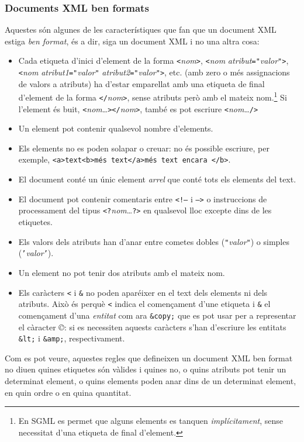 \subsubsection{Documents XML ben formats}
Aquestes són algunes de les característiques que fan que un document
XML estiga \emph{ben format}, és a dir, siga un document XML i no una
altra cosa:
\begin{itemize}
\item Cada etiqueta d'inici d'element de la forma
  \texttt{<}\emph{nom}\texttt{>}, \texttt{<}\emph{nom}
  \emph{atribut}\texttt{=}\texttt{"}\emph{valor}\texttt{"}\texttt{>},
  \texttt{<}\emph{nom}
  \emph{atribut1}\texttt{=}\texttt{"}\emph{valor}\texttt{"}
  \emph{atribut2}\texttt{=}\texttt{"}\emph{valor}\texttt{"}\texttt{>},
  etc. (amb zero o més assignacions de valors a atributs) ha d'estar
  emparellat amb una etiqueta de final d'element de la forma
  \texttt{</}\emph{nom}\texttt{>}, sense atributs però amb el mateix
  nom.\footnote{En SGML es permet que alguns elements es tanquen
    \emph{implícitament}, sense necessitat d'una etiqueta de final
    d'element.} Si l'element és buit,
  \texttt{<}\emph{nom}\ldots\texttt{></}\emph{nom}\texttt{>}, també es
  pot escriure \texttt{<}\emph{nom}\ldots\texttt{/>}
\item Un element pot contenir qualsevol nombre d'elements.
\item Els elements no es poden solapar o creuar: no és possible
  escriure, per exemple, \texttt{<a>text<b>més text</a>més text encara
    </b>}.
\item El document conté un únic element \emph{arrel} que conté tots
  els elements del text.
\item El document pot contenir comentaris entre \texttt{<!--} i
  \texttt{-->} o instruccions de processament del tipus
  \texttt{<?}\emph{nom}\ldots\texttt{?>} en qualsevol lloc excepte
  dins de les etiquetes.
\item Els valors dels atributs han d'anar entre cometes dobles
  (\texttt{"}\emph{valor}\texttt{"}) o simples
  (\texttt{'}\emph{valor}\texttt{'}).
\item Un element no pot tenir dos atributs amb el mateix nom.
\item Els caràcters \texttt{<} i \texttt{\&} no poden aparéixer en el
  text dels elements ni dels atributs. Això és perquè \texttt{<}
  indica el començament d'une etiqueta i \texttt{\&} el començament
  d'una \emph{entitat} com ara \texttt{\&copy;} que es pot usar per a
  representar el càracter \emph{©}: si es necessiten aquests caràcters
  s'han d'escriure les entitats \texttt{\&lt;} i \texttt{\&amp;},
  respectivament.
\end{itemize}
Com es pot veure, aquestes regles que defineixen un document XML ben
format no diuen quines etiquetes són vàlides i quines no, o quins
atributs pot tenir un determinat element, o quins elements poden anar
dins de un determinat element, en quin ordre o en quina quantitat.


